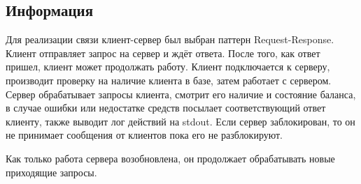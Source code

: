 \documentclass[12pt]{article}
\begin{document}
\subsection*{Информация}

Для реализации связи клиент-сервер был выбран паттерн Request-Response. Клиент отправляет запрос на сервер и ждёт ответа. После того, как ответ пришел, клиент может продолжать работу. Клиент подключается к серверу, производит проверку на наличие клиента в базе, затем работает с сервером. Сервер обрабатывает запросы
клиента, смотрит его наличие и состояние баланса, в случае ошибки или недостатке средств посылает соответствующий ответ клиенту, также выводит лог действий на stdout. Если сервер заблокирован, то он не принимает сообщения от клиентов пока его не разблокируют.


\noindent Как только работа сервера возобновлена, он продолжает обрабатывать новые приходящие запросы.
\end{document}
